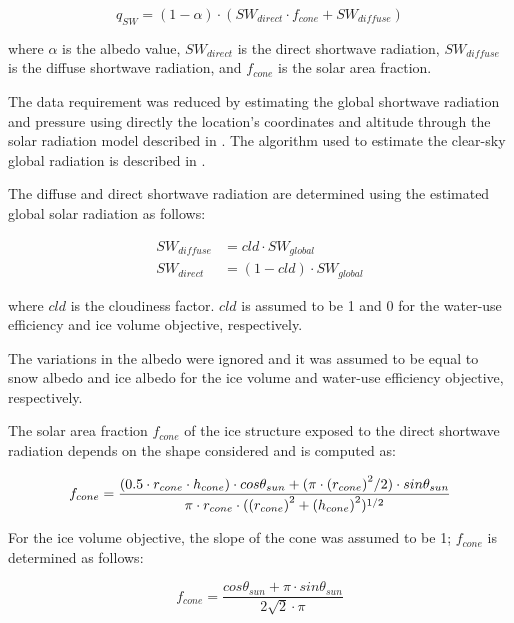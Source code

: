 \documentclass[tc, manuscript]{copernicus}
\begin{document}
\begin{equation} 
q_{SW} = (1- \alpha) \cdot ( SW_{direct} \cdot f_{cone} + SW_{diffuse})
\label{eqn:SW} 
\end{equation}

where $\alpha$ is the albedo value, $SW_{direct}$ is the direct shortwave radiation, $SW_{diffuse}$ is the
diffuse shortwave radiation, and $f_{cone}$ is the solar area fraction.

The data requirement was reduced by estimating the global shortwave radiation and pressure using directly the
location's coordinates and altitude through the solar radiation model described in
\citet{holmgrenPvlibPythonPython2018}. The algorithm used to estimate the clear-sky global radiation is
described in \citet{ineichenBroadbandSimplifiedVersion2008}.  

The diffuse and direct shortwave radiation are determined using the estimated global solar radiation as follows:

\begin{equation}
\begin{split}
  SW_{diffuse} &= cld \cdot SW_{global}\\
  SW_{direct} &= (1-cld) \cdot SW_{global}
\end{split}
\end{equation}

where $cld$ is the cloudiness factor. $cld$ is assumed to be 1 and 0 for the water-use efficiency and ice volume
objective, respectively.

The variations in the albedo were ignored and it was assumed to be equal to snow albedo and ice albedo for the
ice volume and water-use efficiency objective, respectively.

The solar area fraction $f_{cone}$ of the ice structure exposed to the direct shortwave radiation depends on the
shape considered and is computed as:

\begin{equation}
		f_{cone} =\frac{(0.5 \cdot r_{cone} \cdot h_{cone}) \cdot cos \theta_{sun} +(\pi \cdot
			{(r_{cone})}^2/2) \cdot sin \theta_{sun} }{\pi \cdot r_{cone} \cdot ({(r_{cone})}^2+{(h_{cone})}^2)^{1/2}}\\
\end{equation}

For the ice volume objective, the slope of the cone was assumed to be 1; $f_{cone}$ is determined as follows:

\begin{equation}
		f_{cone} =\frac{ cos \theta_{sun} + \pi \cdot sin \theta_{sun} }{2\sqrt{2} \cdot \pi }
\end{equation}
\end{document}

